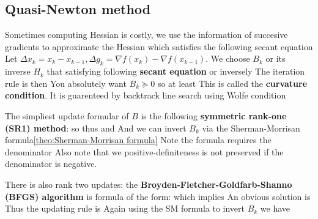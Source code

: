 \documentclass[a4paper]{mynotes}
\begin{document}
\subsection{Quasi-Newton method}
Sometimes computing Hessian is costly, we use the information of succesive gradients to approximate the Hessian
which satisfies the following secant equation
 Let $\Delta x_k=x_k-x_{k-1},\Delta g_k=\nabla f(x_{k})-\nabla f(x_{k-1})$. We choose $B_k$ or its inverse $H_k$ that satisfying following \textbf{secant equation}
or inversely 
The iteration rule is then
You absolutely want $B_k\succeq 0$ so at least This is called the \textbf{curvature condition}.
It is guarenteed by backtrack line search using Wolfe condition

The simpliest update formular of $B$ is the following \textbf{symmetric rank-one (SR1) method}:
so thus 
and 
And we can invert $B_{k}$ via the Sherman-Morrisan formula\ref{theo:Sherman-Morrisan formula}
Note the formula requires the denominator 
Also note that we positive-definiteness is not preserved if the denominator is negative. 

There is also rank two updates:  the \textbf{Broyden-Fletcher-Goldfarb-Shanno (BFGS) algorithm}
is formula of the form: 
which implies
An obvious solution is 
  Thus the updating rule is 
  Again using the SM formula to invert $B_k$ we have
\end{document}
